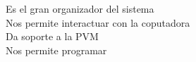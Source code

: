\documentclass[preview]{standalone}
\begin{document}
Es el gran organizador del sistema\\Nos permite interactuar con la coputadora\\Da soporte a la PVM\\Nos permite programar\\
\end{document}
